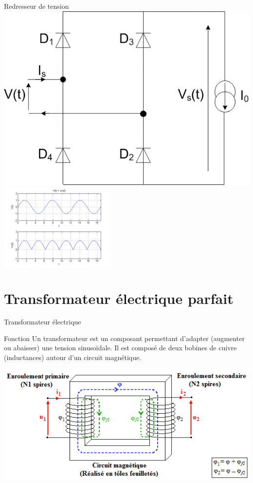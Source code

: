 \documentclass{beamer}
\begin{document}
\begin{frame}{Redresseur de tension}
  \centering
  \includegraphics[height=.4\textheight]{images/redresseur}
  \includegraphics[height=.4\textheight]{images/redresseur_courbes}
\end{frame}
\section{Transformateur électrique parfait}

\begin{frame}{Transformateur électrique}
  \begin{alertblock}{Fonction}
    Un transformateur est un composant permettant d’adapter (augmenter ou abaisser) une tension sinusoïdale. Il est composé de deux bobines de cuivre (inductances) autour d’un circuit magnétique.
  \end{alertblock}
  \centering
  \includegraphics[height=.4\textheight]{images/transfo_principe}
\end{frame}
\end{document}
